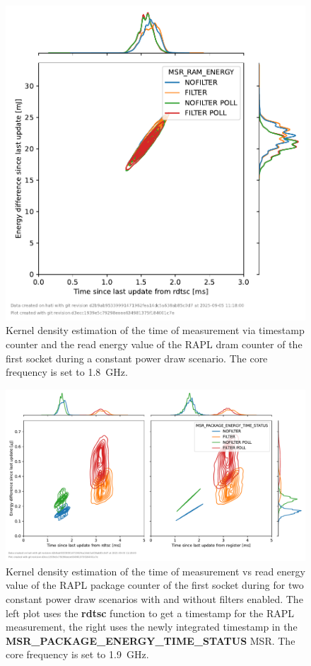 \begin{figure}[]
    \centering
    \includegraphics[width=0.54\columnwidth]{fig/rapl-update-intervals/MSR_RAM_ENERGY_1800000.pdf}
    \caption{Kernel density estimation of the time of measurement via timestamp counter and the read energy value of the RAPL dram counter of the first socket during a constant power draw scenario.
    The core frequency is set to \SI{1.8}{\GHz}.}
\end{figure}

\clearpage
\begin{figure}[]
    \centering
    \includegraphics[width=\columnwidth]{fig/rapl-update-intervals/MSR_PACKAGE_ENERGY_TIME_STATUS_1900000.pdf}
    \caption{Kernel density estimation of the time of measurement vs read energy value of the RAPL package counter of the first socket during for two constant power draw scenarios with and without filters enabled.
    The left plot uses the \textbf{rdtsc} function to get a timestamp for the RAPL measurement, the right uses the newly integrated timestamp in the \textbf{MSR\_PACKAGE\_ENERGY\_TIME\_STATUS} MSR.
    The core frequency is set to \SI{1.9}{\GHz}.}
\end{figure}

